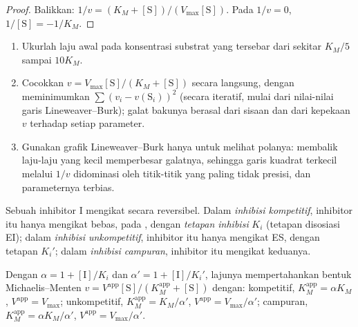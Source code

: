 \begin{proof}
Balikkan: $1/v = (K_M + [\mathrm S])/(V_{\max}[\mathrm S])$. Pada $1/v = 0$, $1/[\mathrm S] = -1/K_M$.
\end{proof}

\begin{method}\label{met:b3:complex-kinetics:mm-fit}
\begin{enumerate}
  \item Ukurlah laju awal pada konsentrasi substrat yang tersebar dari sekitar
        $K_M/5$ sampai $10K_M$.
  \item Cocokkan $v = V_{\max}[\mathrm S]/(K_M + [\mathrm S])$ secara langsung, dengan
        meminimumkan $\sum(v_i - v(\mathrm S_i))^2$ (secara iteratif, mulai dari
        nilai-nilai garis Lineweaver--Burk); galat bakunya berasal dari sisaan
        dan dari kepekaan $v$ terhadap setiap parameter.
  \item Gunakan grafik Lineweaver--Burk hanya untuk melihat polanya: membalik
        laju-laju yang kecil memperbesar galatnya, sehingga garis kuadrat
        terkecil melalui $1/v$ didominasi oleh titik-titik yang paling tidak
        presisi, dan parameternya terbias.
\end{enumerate}
\end{method}

\begin{definition}[Inhibisi]\label{def:b3:complex-kinetics:inhibition}
Sebuah inhibitor I mengikat  secara reversibel. Dalam \emph{inhibisi
kompetitif}, inhibitor itu hanya mengikat 
bebas, pada , dengan \emph{tetapan inhibisi}
$K_i$ (tetapan disosiasi EI); dalam \emph{inhibisi
unkompetitif}, inhibitor itu hanya mengikat ES,
dengan tetapan $K_i'$; dalam \emph{inhibisi campuran},
inhibitor itu mengikat keduanya.
\end{definition}

\begin{proposition}\label{prop:b3:complex-kinetics:inhibition-laws}
Dengan $\alpha = 1 + [\mathrm I]/K_i$ dan $\alpha' = 1 + [\mathrm I]/K_i'$, lajunya
mempertahankan bentuk Michaelis--Menten
$v = V^{\mathrm{app}}[\mathrm S]/(K_M^{\mathrm{app}} + [\mathrm S])$ dengan: kompetitif,
$K_M^{\mathrm{app}} = \alpha K_M$, $V^{\mathrm{app}} = V_{\max}$; unkompetitif,
$K_M^{\mathrm{app}} = K_M/\alpha'$, $V^{\mathrm{app}} =
V_{\max}/\alpha'$; campuran, $K_M^{\mathrm{app}} = \alpha K_M/\alpha'$, $V^{\mathrm{app}} = V_{\max}/\alpha'$.
\end{proposition}

